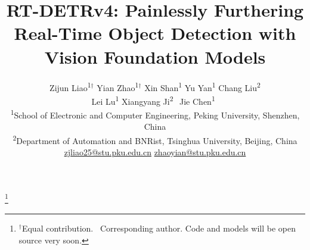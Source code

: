 \documentclass[10pt,twocolumn,letterpaper]{article}
\title{RT-DETRv4: Painlessly Furthering Real-Time Object Detection with \\ Vision Foundation Models}
\author{Zijun Liao\textsuperscript{1}$^\dag$ \quad Yian Zhao\textsuperscript{1}$^{\dag}$ \quad Xin Shan\textsuperscript{1} \quad Yu Yan\textsuperscript{1} \quad Chang Liu\textsuperscript{2} \\ Lei Lu\textsuperscript{1} \quad
Xiangyang Ji\textsuperscript{2\ \Letter} \quad Jie Chen\textsuperscript{1\ \Letter} \\
\small \textsuperscript{1}School of Electronic and Computer Engineering, Peking University, Shenzhen, China \\
\small \textsuperscript{2}Department of Automation and BNRist, Tsinghua University, Beijing, China \\
\small \href{mailto:zjliao25@stu.pku.edu.cn}{zjliao25@stu.pku.edu.cn} \quad 
\small \href{mailto:zhaoyian@stu.pku.edu.cn}{zhaoyian@stu.pku.edu.cn}
\vspace*{-7mm}
}
\begin{document}
\maketitle

\footnote{$^\dag$Equal contribution. \Letter\ Corresponding author. Code and models will be open source very soon.}






{
    \small
    
    
}
\end{document}
